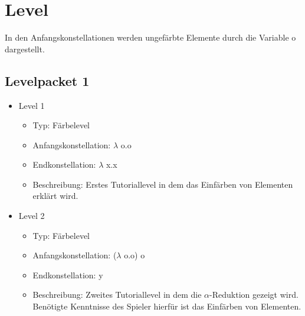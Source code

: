 \chapter{Level}
In den Anfangskonstellationen werden ungefärbte Elemente durch die Variable o dargestellt.

\section{Levelpacket 1}
\begin{itemize}
	\item{Level 1} 
		\begin{itemize}
			\item{Typ:} Färbelevel 
			\item{Anfangskonstellation:} \(\lambda\) o.o  
			\item{Endkonstellation:} \(\lambda\) x.x 
			\item{Beschreibung:} Erstes Tutoriallevel in dem das Einfärben von Elementen erklärt wird.
		\end{itemize}
	\item{Level 2} 
		\begin{itemize}
			\item{Typ:} Färbelevel 
			\item{Anfangskonstellation:} (\(\lambda\) o.o) o  
			\item{Endkonstellation:} y 
			\item{Beschreibung:} Zweites Tutoriallevel in dem die \(\alpha\)-Reduktion gezeigt wird.
								Benötigte Kenntnisse des Spieler hierfür ist das Einfärben von Elementen. 
		\end{itemize}
\end{itemize}
